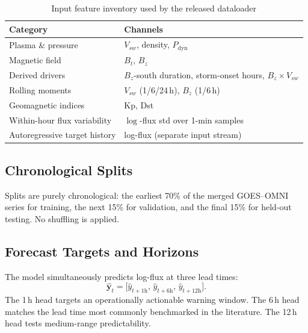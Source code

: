 \documentclass{ieeeaccess}
\begin{document}
\begin{table}[h]
\centering
\caption{Input feature inventory used by the released dataloader}
\label{tab:features}
\begin{tabular}{@{}ll@{}}
\toprule
\textbf{Category} & \textbf{Channels} \\ \midrule
Plasma \& pressure & \(V_{sw}\), density, \(P_{\mathrm{dyn}}\) \\
Magnetic field & \(B_t\), \(B_z\) \\
Derived drivers & \(B_z\)-south duration, storm-onset hours, \(B_z\times V_{sw}\) \\
Rolling moments & \(V_{sw}\) (1/6/24\,h), \(B_z\) (1/6\,h) \\
Geomagnetic indices & Kp, Dst \\
Within-hour flux variability & \(\log\)-flux std over 1-min samples \\
Autoregressive target history & log-flux (separate input stream) \\ \bottomrule
\end{tabular}
\end{table}

\subsection{Chronological Splits}
Splits are purely chronological: the earliest 70\% of the merged GOES--OMNI series
for training, the next 15\% for validation, and the final 15\% for held-out
testing. No shuffling is applied.

\subsection{Forecast Targets and Horizons}
The model simultaneously predicts log-flux at three lead times:
\begin{equation}
\hat{\mathbf{y}}_{t}
=
\bigl[\hat{y}_{t+1\mathrm{h}},\,
\hat{y}_{t+6\mathrm{h}},\,
\hat{y}_{t+12\mathrm{h}}\bigr].
\label{eq:horizons}
\end{equation}
The 1\,h head targets an operationally actionable warning window.
The 6\,h head matches the lead time most commonly benchmarked in the literature.
The 12\,h head tests medium-range predictability.
\end{document}
